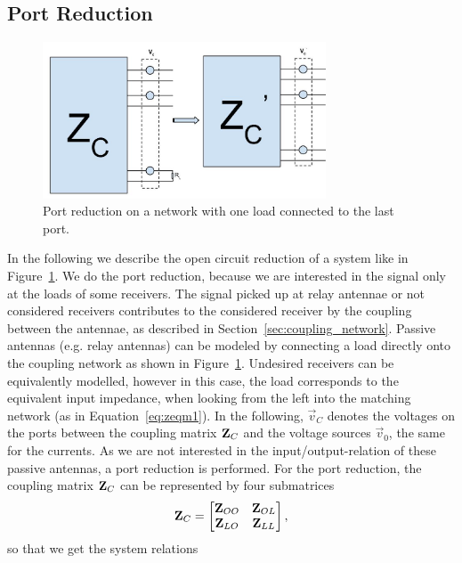 \subsection{Port Reduction}
\label{sec:port_reduction}

\begin{figure}
\begin{center}
\includegraphics[width=0.75\textwidth]{images/Port_reduction.jpg}
\caption{Port reduction on a network with one load connected to the last port.}
\label{fig:port_reduction}
\end{center}
\end{figure}
In the following we describe the open circuit reduction of a system like in Figure~\ref{fig:port_reduction}.
We do the port reduction, because we are interested in the signal only at the loads of some receivers.
The signal picked up at relay antennae or not considered receivers contributes to the considered receiver by the coupling between the antennae, as described in Section~\ref{sec:coupling_network}.
Passive antennas (e.g. relay antennas) can be modeled by connecting a load directly onto the coupling network as shown in Figure~\ref{fig:port_reduction}.
Undesired receivers can be equivalently modelled, however in this case, the load corresponds to the equivalent input impedance, when looking from the left into the matching network (as in Equation~\eqref{eq:zeqm1}).
In the following, $\vec{v}_C$ denotes the voltages on the ports between the coupling matrix $\mathbf{Z}_C$ and the voltage sources $\vec{v}_0$, the same for the currents.
As we are not interested in the input/output-relation of these passive antennas, a port reduction is performed.
For the port reduction, the coupling matrix $\mathbf{Z}_C$ can be represented by four submatrices
\begin{equation}
\mathbf{Z}_C=
\begin{bmatrix}
\mathbf{Z}_{OO} & \mathbf{Z}_{OL}\\
\mathbf{Z}_{LO} & \mathbf{Z}_{LL}
\end{bmatrix},
\end{equation}
so that we get the system relations

